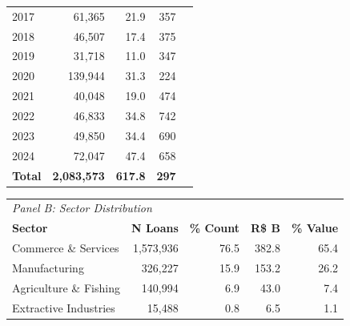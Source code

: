 \documentclass{article}
\begin{document}
\begin{table}[H]
\begin{threeparttable}
\begin{tabular}{lrrrr}
            2017           & 61,365             & 21.9                   & 357                  \\
            2018           & 46,507             & 17.4                   & 375                  \\
            2019           & 31,718             & 11.0                   & 347                  \\
            2020           & 139,944            & 31.3                   & 224                  \\
            2021           & 40,048             & 19.0                   & 474                  \\
            2022           & 46,833             & 34.8                   & 742                  \\
            2023           & 49,850             & 34.4                   & 690                  \\
            2024           & 72,047             & 47.4                   & 658                  \\
            \midrule
            \textbf{Total} & \textbf{2,083,573} & \textbf{617.8}         & \textbf{297}         \\
            \bottomrule
        \end{tabular}

        \vspace{0.5em}

        \begin{tabular}{lrrrr}
            \toprule
            \multicolumn{5}{l}{\textit{Panel B: Sector Distribution}}                                          \\
            \textbf{Sector}        & \textbf{N Loans} & \textbf{\% Count} & \textbf{R\$ B} & \textbf{\% Value} \\
            \midrule
            Commerce \& Services   & 1,573,936        & 76.5              & 382.8          & 65.4              \\
            Manufacturing          & 326,227          & 15.9              & 153.2          & 26.2              \\
            Agriculture \& Fishing & 140,994          & 6.9               & 43.0           & 7.4               \\
            Extractive Industries  & 15,488           & 0.8               & 6.5            & 1.1               \\
            \bottomrule
        \end{tabular}


\end{threeparttable}
\end{table}
\end{document}

